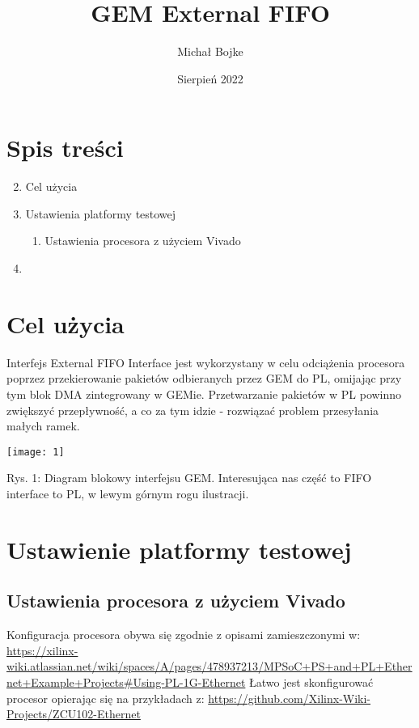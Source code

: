 \documentclass[11pt, letterpaper]{article}
\title{GEM External FIFO}
\author{Michał Bojke}
\date{Sierpień 2022}
\begin{document}
\maketitle
\section{Spis treści}%
\label{sec:Spis treści}
\begin{enumerate}
    \setcounter{enumi}{1}
    \item Cel użycia
    \item Ustawienia platformy testowej
        \begin{enumerate}
            \item Ustawienia procesora z użyciem Vivado
        \end{enumerate}
    \item
\end{enumerate}
\pagebreak
\section{Cel użycia}
Interfejs External FIFO Interface jest wykorzystany w celu odciążenia procesora poprzez przekierowanie pakietów odbieranych przez GEM do PL, omijając przy tym blok DMA zintegrowany w GEMie. Przetwarzanie pakietów w PL powinno zwiększyć przepływność, a co za tym idzie - rozwiązać problem przesyłania małych ramek.

\vspace{10mm}

\texttt{[image: 1]}
\caption{Rys. 1: Diagram blokowy interfejsu GEM. Interesująca nas część to FIFO interface to PL, w lewym górnym rogu ilustracji.}

\vspace{10mm}

\section{Ustawienie platformy testowej}
\subsection{Ustawienia procesora z użyciem Vivado}
Konfiguracja procesora obywa się zgodnie z opisami zamieszczonymi w:
\linebreak
\url{https://xilinx-wiki.atlassian.net/wiki/spaces/A/pages/478937213/MPSoC+PS+and+PL+Ethernet+Example+Projects#Using-PL-1G-Ethernet}
\pagebreak
\linebreak
Łatwo jest skonfigurować procesor opierając się na przykładach z:
\linebreak
\url{https://github.com/Xilinx-Wiki-Projects/ZCU102-Ethernet}
\end{document}

